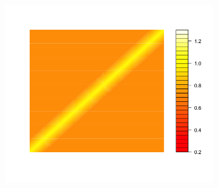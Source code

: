 \begin{figure}[H]
\begin{subfigure}[t]{0.19\textwidth}
\end{subfigure}
\hfill
  \begin{subfigure}[t]{0.19\textwidth}
\centering
\includegraphics[width = \textwidth]{../img/chapter-4/true-covariance-5-heat-map}
\end{subfigure}
\end{figure}

